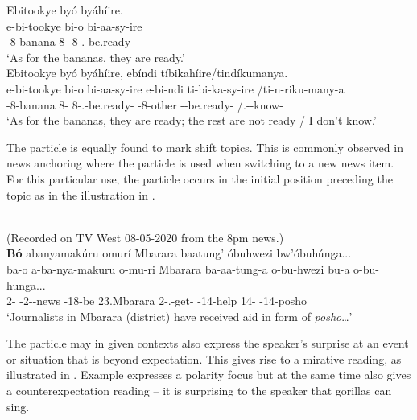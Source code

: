 \documentclass[output=paper]{langscibook}
\begin{document}
\ex
\label{bkm:Ref113716593:b}
Ebitookye byó byáhíire.\\
\gll
e-bi-tookye  bi-o  bi-aa-sy-ire\\
\AUG{}-8-banana  8-\CM{}  8\SM{}-\N{}.\PST{}-be.ready-\PFV{}\\
\glt
‘As for the bananas, they are ready.'\\


\ex
\label{bkm:Ref113716593:c}
Ebitookye byó byáhíire, ebíndi tíbikahíire/tindíkumanya.\\
\gll
    e-bi-tookye  bi-o  bi-aa-sy-ire  e-bi-ndi     ti-bi-ka-sy-ire  /ti-n-riku-many-a \\
\AUG{}-8-banana  8-\CM{}  8\SM{}-\N{}.\PST{}-be.ready-\PFV{}  \AUG{}-8-{}other \SM-\NEG-be.ready-\PFV{}  /\SG.\SM-\IPFV{}-know-\FV{}\\
\glt
 	\glt ‘As for the bananas, they are ready; the rest are not ready / I don’t know.’\\

\z
\z

The particle is equally found to mark shift topics. This is commonly observed in news anchoring where the particle is used when switching to a new news item. For this particular use, the particle occurs in the initial position preceding the topic as in the illustration in .


\ea
\label{bkm:Ref113716936}
\citep[13]{AsiimwevanderWal2021}\\
(Recorded on TV West 08-05-2020 from the 8pm news.)\\
\textbf{Bó} abanyamakúru omurí Mbarara baatung’ óbuhwezi bw’óbuhúnga...\\
\gll
ba-o  a-ba-nya-makuru  o-mu-ri  Mbarara  ba-aa-tung-a   o-bu-hwezi  bu-a  o-bu-hunga... \\
2-\CM{}  \AUG{}-2-\NMLZ{}-news  \AUG{}-18-be  23.Mbarara  2\SM{}-\N{}.\PST{}-get-\FV{} \AUG{}-14-help  14-\CONN{}  \AUG{}-14-posho \\
\glt
`Journalists in Mbarara (district) have received aid in form of \textit{posho}…’\\

\z

The particle may in given contexts also express the speaker’s surprise at an event or situation that is beyond expectation. This gives rise to a mirative reading, as illustrated in  \citep[see also][]{Asiimwe2023}. Example  expresses a polarity focus but at the same time also gives a counterexpectation reading – it is surprising to the speaker that gorillas can sing.\largerpage
\end{document}
